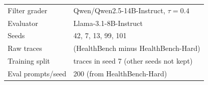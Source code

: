 \documentclass{article}
\newcommand{\hbhard}{HealthBench-Hard}
\begin{document}
\begin{table}[t]
\begin{tabular}{ll}
Filter grader & Qwen/Qwen2.5-14B-Instruct, $\tau{=}0.4$ \\
Evaluator & Llama-3.1-8B-Instruct \\
Seeds & 42, 7, 13, 99, 101 \\
Raw traces & \statHBMedGemmaMayFilterRaw{} (HealthBench minus \hbhard{}) \\
Training split & \statHBMedGemmaMayFilterTrainSplit{} traces in seed 7 (other seeds not kept) \\
Eval prompts/seed & 200 (from \statHBMedGemmaMayPopulationPrompts{} \hbhard{}) \\
\bottomrule
\end{tabular}
\end{table}

\end{document}
